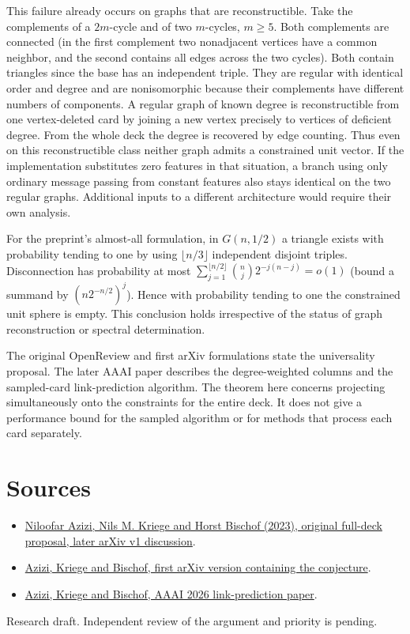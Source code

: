 \documentclass[11pt]{article}
\begin{document}
This failure already occurs on graphs that are reconstructible. Take the complements of a $2m$-cycle and of two $m$-cycles, $m\ge5$. Both complements are connected (in the first complement two nonadjacent vertices have a common neighbor, and the second contains all edges across the two cycles). Both contain triangles since the base has an independent triple. They are regular with identical order and degree and are nonisomorphic because their complements have different numbers of components. A regular graph of known degree is reconstructible from one vertex-deleted card by joining a new vertex precisely to vertices of deficient degree. From the whole deck the degree is recovered by edge counting. Thus even on this reconstructible class neither graph admits a constrained unit vector. If the implementation substitutes zero features in that situation, a branch using only ordinary message passing from constant features also stays identical on the two regular graphs. Additional inputs to a different architecture would require their own analysis.

For the preprint's almost-all formulation, in $G(n,1/2)$ a triangle exists with probability tending to one by using $\lfloor n/3\rfloor$ independent disjoint triples. Disconnection has probability at most $\sum_{j=1}^{\lfloor n/2\rfloor}\binom nj2^{-j(n-j)}=o(1)$ (bound a summand by $(n2^{-n/2})^j$). Hence with probability tending to one the constrained unit sphere is empty. This conclusion holds irrespective of the status of graph reconstruction or spectral determination.

The original OpenReview and first arXiv formulations state the universality proposal. The later AAAI paper describes the degree-weighted columns and the sampled-card link-prediction algorithm. The theorem here concerns projecting simultaneously onto the constraints for the entire deck. It does not give a performance bound for the sampled algorithm or for methods that process each card separately.

\section*{Sources}
\begin{itemize}\setlength{\itemsep}{0pt}\setlength{\parskip}{0pt}
\item \href{https://openreview.net/pdf?id=KcRbiPwuNS}{Niloofar Azizi, Nils M. Kriege and Horst Bischof (2023), original full-deck proposal, later arXiv v1 discussion}.
\item \href{https://arxiv.org/abs/2408.12334v1}{Azizi, Kriege and Bischof, first arXiv version containing the conjecture}.
\item \href{https://ojs.aaai.org/index.php/AAAI/article/view/39044}{Azizi, Kriege and Bischof, AAAI 2026 link-prediction paper}.
\end{itemize}
{\small Research draft. Independent review of the argument and priority is pending.}
\end{document}
